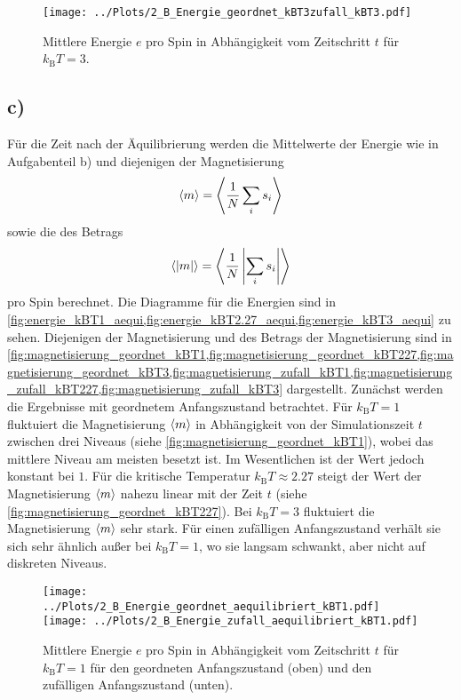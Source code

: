 \begin{figure}[H]
\centering
\texttt{[image: ../Plots/2\_B\_Energie\_geordnet\_kBT3zufall\_kBT3.pdf]}
\caption{Mittlere Energie $e$ pro Spin in Abhängigkeit vom Zeitschritt $t$ für $k_\text{B}T=3$.}
\label{fig:energie_kBT3}
\end{figure}

\subsection*{c)}
Für die Zeit nach der Äquilibrierung werden die Mittelwerte der Energie wie in Aufgabenteil b) und diejenigen der Magnetisierung \[\braket{m}=\left<\frac{1}{N}\sum_is_i\right>\] sowie die des Betrags \[\braket{|m|}=\left<\frac{1}{N}\left|\sum_is_i\right|\right>\] pro Spin berechnet.
Die Diagramme für die Energien sind in \cref{fig:energie_kBT1_aequi,fig:energie_kBT2.27_aequi,fig:energie_kBT3_aequi} zu sehen.
Diejenigen der Magnetisierung und des Betrags der Magnetisierung sind in \cref{fig:magnetisierung_geordnet_kBT1,fig:magnetisierung_geordnet_kBT227,fig:magnetisierung_geordnet_kBT3,fig:magnetisierung_zufall_kBT1,fig:magnetisierung_zufall_kBT227,fig:magnetisierung_zufall_kBT3} dargestellt.
Zunächst werden die Ergebnisse mit geordnetem Anfangszustand betrachtet.
Für $k_\text{B}T=1$ fluktuiert die Magnetisierung $\braket{m}$ in Abhängigkeit von der Simulationszeit $t$ zwischen drei Niveaus (siehe \cref{fig:magnetisierung_geordnet_kBT1}), wobei das mittlere Niveau am meisten besetzt ist.
Im Wesentlichen ist der Wert jedoch konstant bei $1$.
Für die kritische Temperatur $k_\text{B}T\approx\num{2.27}$ steigt der Wert der Magnetisierung $\braket{m}$ nahezu linear mit der Zeit $t$ (siehe \cref{fig:magnetisierung_geordnet_kBT227}).
Bei $k_\text{B}T=3$ fluktuiert die Magnetisierung $\braket{m}$ sehr stark.
Für einen zufälligen Anfangszustand verhält sie sich sehr ähnlich außer bei $k_\text{B}T=1$, wo sie langsam schwankt, aber nicht auf diskreten Niveaus.

\begin{figure}[H]
\centering
\texttt{[image: ../Plots/2\_B\_Energie\_geordnet\_aequilibriert\_kBT1.pdf]}
\texttt{[image: ../Plots/2\_B\_Energie\_zufall\_aequilibriert\_kBT1.pdf]}
\caption{Mittlere Energie $e$ pro Spin in Abhängigkeit vom Zeitschritt $t$ für $k_\text{B}T=1$ für den geordneten Anfangszustand (oben) und den zufälligen Anfangszustand (unten).}
\label{fig:energie_kBT1_aequi}
\end{figure}

